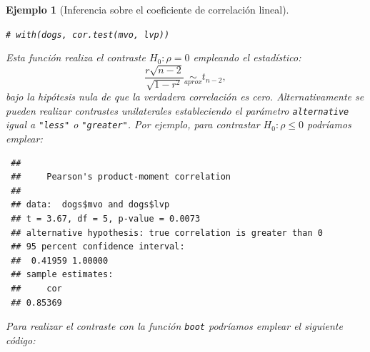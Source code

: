 \documentclass[
  10pt,
]{book}
\newenvironment{Shaded}{\begin{snugshade}}{\end{snugshade}}
\newcommand{\AttributeTok}[1]{\textcolor[rgb]{0.77,0.63,0.00}{#1}}
\newcommand{\CommentTok}[1]{\textcolor[rgb]{0.56,0.35,0.01}{\textit{#1}}}
\newcommand{\ControlFlowTok}[1]{\textcolor[rgb]{0.13,0.29,0.53}{\textbf{#1}}}
\newcommand{\DecValTok}[1]{\textcolor[rgb]{0.00,0.00,0.81}{#1}}
\newcommand{\FunctionTok}[1]{\textcolor[rgb]{0.00,0.00,0.00}{#1}}
\newcommand{\NormalTok}[1]{#1}
\newcommand{\OtherTok}[1]{\textcolor[rgb]{0.56,0.35,0.01}{#1}}
\newcommand{\SpecialCharTok}[1]{\textcolor[rgb]{0.00,0.00,0.00}{#1}}
\newcommand{\StringTok}[1]{\textcolor[rgb]{0.31,0.60,0.02}{#1}}
\theoremstyle{break}
\newtheorem{example}{Ejemplo}[chapter]
\theoremstyle{nonumberplain}
\renewcommand{\CommentTok}[1]{\textcolor[rgb]{0.41,0.41,0.41}{\texttt{#1}}}
\begin{document}
\begin{example}[Inferencia sobre el coeficiente de correlación lineal]
\begin{Shaded}
\begin{Highlighting}[]
\CommentTok{\# with(dogs, cor.test(mvo, lvp))}
\end{Highlighting}
\end{Shaded}

Esta función realiza el contraste \(H_0: \rho = 0\) empleando el estadístico:
\[\frac{r\sqrt{n - 2}}{\sqrt{1 - r^2}} \underset{aprox}{\sim } t_{n-2},\]
bajo la hipótesis nula de que la verdadera correlación es cero.
Alternativamente se pueden realizar contrastes unilaterales estableciendo
el parámetro \texttt{alternative} igual a \texttt{"less"} o \texttt{"greater"}.
Por ejemplo, para contrastar \(H_0: \rho \leq 0\) podríamos emplear:

\begin{Shaded}
\end{Shaded}

\begin{verbatim}
 ## 
 ##     Pearson's product-moment correlation
 ## 
 ## data:  dogs$mvo and dogs$lvp
 ## t = 3.67, df = 5, p-value = 0.0073
 ## alternative hypothesis: true correlation is greater than 0
 ## 95 percent confidence interval:
 ##  0.41959 1.00000
 ## sample estimates:
 ##     cor 
 ## 0.85369
\end{verbatim}

Para realizar el contraste con la función \texttt{boot} podríamos
emplear el siguiente código:

\begin{Shaded}
\end{Shaded}


\end{example}
\end{document}
